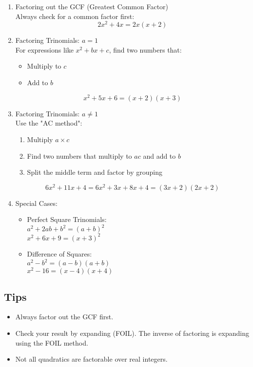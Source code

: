 \begin{enumerate}
  \item Factoring out the GCF (Greatest Common Factor) \\
  Always check for a common factor first:
  \[
  2x^2 + 4x = 2x(x + 2)
  \]

  \item Factoring Trinomials: \( a = 1 \) \\
  For expressions like \( x^2 + bx + c \), find two numbers that:
  \begin{itemize}
    \item Multiply to \( c \)
    \item Add to \( b \)
  \end{itemize}
  \[
  x^2 + 5x + 6 = (x + 2)(x + 3)
  \]

  \item Factoring Trinomials: \( a \neq 1 \) \\
  Use the "AC method":
  \begin{enumerate}
    \item Multiply \( a \times c \)
    \item Find two numbers that multiply to \( ac \) and add to \( b \)
    \item Split the middle term and factor by grouping
  \end{enumerate}
  \[
  6x^2 + 11x + 4 = 6x^2 + 3x + 8x + 4 = (3x + 2)(2x + 2)
  \]

  \item Special Cases:
  \begin{itemize}
    \item Perfect Square Trinomials: \\
    \( a^2 + 2ab + b^2 = (a + b)^2 \) \\
    \( x^2 + 6x + 9 = (x + 3)^2 \)

    \item Difference of Squares: \\
    \( a^2 - b^2 = (a - b)(a + b) \) \\
    \( x^2 - 16 = (x - 4)(x + 4) \)
  \end{itemize}
\end{enumerate}

\subsection*{Tips}
\begin{itemize}
  \item Always factor out the GCF first.
  \item Check your result by expanding (FOIL). The inverse of factoring is expanding using the FOIL method.
  \item Not all quadratics are factorable over real integers.
\end{itemize}



